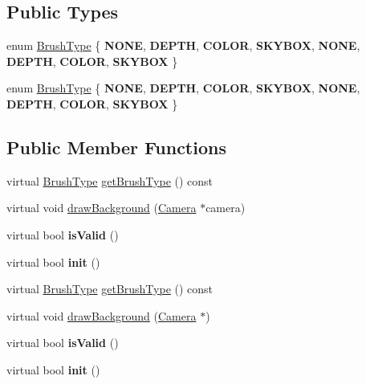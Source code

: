 \subsection*{Public Types}
\begin{DoxyCompactItemize}
\item 
enum \hyperlink{classCameraBackgroundBrush_acb83e8d05e7ab9386c041d22c444760f}{Brush\+Type} \{ \newline
{\bfseries N\+O\+NE}, 
{\bfseries D\+E\+P\+TH}, 
{\bfseries C\+O\+L\+OR}, 
{\bfseries S\+K\+Y\+B\+OX}, 
\newline
{\bfseries N\+O\+NE}, 
{\bfseries D\+E\+P\+TH}, 
{\bfseries C\+O\+L\+OR}, 
{\bfseries S\+K\+Y\+B\+OX}
 \}
\item 
enum \hyperlink{classCameraBackgroundBrush_acb83e8d05e7ab9386c041d22c444760f}{Brush\+Type} \{ \newline
{\bfseries N\+O\+NE}, 
{\bfseries D\+E\+P\+TH}, 
{\bfseries C\+O\+L\+OR}, 
{\bfseries S\+K\+Y\+B\+OX}, 
\newline
{\bfseries N\+O\+NE}, 
{\bfseries D\+E\+P\+TH}, 
{\bfseries C\+O\+L\+OR}, 
{\bfseries S\+K\+Y\+B\+OX}
 \}
\end{DoxyCompactItemize}
\subsection*{Public Member Functions}
\begin{DoxyCompactItemize}
\item 
virtual \hyperlink{classCameraBackgroundBrush_acb83e8d05e7ab9386c041d22c444760f}{Brush\+Type} \hyperlink{classCameraBackgroundBrush_a72447fd86e40e0d7e263b906c2f9af12}{get\+Brush\+Type} () const
\item 
virtual void \hyperlink{classCameraBackgroundBrush_aa079883211a8ebabf567a1967b325087}{draw\+Background} (\hyperlink{classCamera}{Camera} $\ast$camera)
\item 
\mbox{\label{classCameraBackgroundBrush_ac6742eed79a7cde81855479e54f1b0f7}} 
virtual bool {\bfseries is\+Valid} ()
\item 
\mbox{\label{classCameraBackgroundBrush_ad3a619b3e65c632cdb88acb0b294542c}} 
virtual bool {\bfseries init} ()
\item 
virtual \hyperlink{classCameraBackgroundBrush_acb83e8d05e7ab9386c041d22c444760f}{Brush\+Type} \hyperlink{classCameraBackgroundBrush_a72447fd86e40e0d7e263b906c2f9af12}{get\+Brush\+Type} () const
\item 
virtual void \hyperlink{classCameraBackgroundBrush_a4632a03b7138aaed433ba6340df6ed5c}{draw\+Background} (\hyperlink{classCamera}{Camera} $\ast$)
\item 
\mbox{\label{classCameraBackgroundBrush_ac6742eed79a7cde81855479e54f1b0f7}} 
virtual bool {\bfseries is\+Valid} ()
\item 
\mbox{\label{classCameraBackgroundBrush_ad3a619b3e65c632cdb88acb0b294542c}} 
virtual bool {\bfseries init} ()
\end{DoxyCompactItemize}
